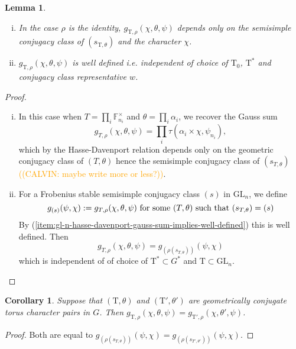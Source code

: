 \documentclass[12pt, reqno]{amsart}
\newtheorem{lemma}[theorem]{Lemma}
\newtheorem{corollary}[theorem]{Corollary}
\theoremstyle{definition}
\theoremstyle{definition}
\theoremstyle{definition}
\newcommand{\multiplicativegroup}[1]{#1^{\times}}
\newcommand{\fieldCharacter}{\psi}
\newcommand{\GL}{\mathrm{GL}}
\newcommand{\finiteField}{\mathbb{F}}
\newcommand{\finiteFieldExtension}[1]{\finiteField_{#1}}
\newcommand{\algebraicGroup}[1]{\boldsymbol{\mathrm{#1}}}
\newcommand{\calvin}[1]{\textcolor{orange}{\sffamily ((CALVIN: #1))}}
\begin{document}
\begin{lemma}
\label{lemma:gl_invariance}
\begin{enumerate}[(i)]
	\item \label{item:gl-n-hasse-davenport-gauss-sum-implies-well-defined} In the case $\rho$ is the identity, $g_{\algebraicGroup{T},\rho}(\chi,\theta,\psi)$ depends only on the semisimple conjugacy class of $(s_{\algebraicGroup{T},\theta})$ and the character $\chi$.
	\item $g_{\algebraicGroup{T},\rho}(\chi,\theta,\psi)$ is well defined i.e. independent of choice of $\algebraicGroup{T}_0$, $\algebraicGroup{T}^*$ and conjugacy class representative $w$.
\end{enumerate}
\end{lemma}
\begin{proof}
\begin{enumerate}[(i)]
	\item In this case when $T = \prod_{i} \multiplicativegroup{\finiteFieldExtension{n_i}}$ and $\theta = \prod_{i} \alpha_i$, we recover the Gauss sum
	\[
	g_{T,\rho}(\chi,\theta,\psi)  = \prod_i \tau(\alpha_i \times \chi, \fieldCharacter_{n_i}),
	\]
	which by the Hasse-Davenport relation depends only on the geometric conjugacy class of $(T,\theta)$ hence the semisimple conjugacy class of $(s_{T,\theta})$ \calvin{maybe write more or less?}. 
	\item For a Frobenius stable semisimple conjugacy class $(s)$ in $\GL_n$, we define
	\[
	g_{(s)}(\psi,\chi) := g_{T,\rho}(\chi,\theta,\psi) \textnormal{ for some } (T,\theta) \textnormal{ such that } (s_{T,\theta}) = (s)
	\]
	By (\ref{item:gl-n-hasse-davenport-gauss-sum-implies-well-defined}) this is well defined. Then
	\[
	g_{T,\rho}(\chi,\theta,\psi)  = g_{(\rho(s_{T,\theta}))}(\psi,\chi)
	\]
	which is independent of of choice of $\algebraicGroup{T}^* \subset G^*$ and $\algebraicGroup{T} \subset \GL_n$.
\end{enumerate}
\end{proof}


\begin{corollary}
\label{cor:geoconj}
Suppose that $(\algebraicGroup{T},\theta)$ and $(\algebraicGroup{T}',\theta')$ are geometrically conjugate torus character pairs in $G$. Then $g_{\algebraicGroup{T},\rho}(\chi,\theta,\psi) = g_{\algebraicGroup{T}',\rho}(\chi,\theta',\psi)$.
\end{corollary}
\begin{proof}
Both are equal to $g_{(\rho(s_{T,\theta}))}(\psi,\chi) = g_{(\rho(s_{T',\theta'}))}(\psi,\chi)$.
\end{proof}
\end{document}
